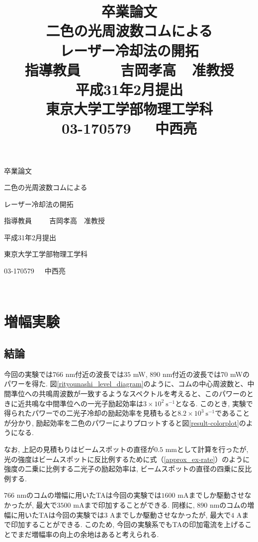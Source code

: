 \documentclass[uplatex, dvipdfmx, a4paper, report, papersize, 11pt]{jsbook}
\title{\fontsize{24.88pt}{0pt}\selectfont 卒業論文 \vspace{2cm}\\ 二色の光周波数コムによる\vspace{4mm}\\ レーザー冷却法の開拓 \vspace{3cm}\\ \fontsize{17.28pt}{0pt}\selectfont 指導教員\ \ \ \ \ 吉岡孝高\ \ 准教授 \vspace{4cm}\\ \fontsize{17.28pt}{0pt}\selectfont  平成31年2月提出 \vspace{2cm} \\ \fontsize{17.28pt}{0pt}\selectfont 東京大学工学部物理工学科 \vspace{3mm} \\ 03-170579\ \ \ 中西亮}
\date{}
\begin{document}
\begin{center}
  \Huge 卒業論文 \par
  \vspace{20mm}
  \Huge 二色の光周波数コムによる \par
  \vspace{4mm}
  \Huge レーザー冷却法の開拓 \par
  \vspace{30mm}
  \LARGE 指導教員\ \ \ \ \ 吉岡孝高\ \ 准教授\par
  \vspace{30mm}
  \LARGE 平成31年2月提出\par
  \vspace{15mm}
  \LARGE 東京大学工学部物理工学科 \par
  \vspace{10mm}
  \LARGE 03-170579\ \ \ 中西亮
  \vspace{10mm}
\end{center}
\thispagestyle{empty}
\clearpage
\addtocounter{page}{-2}
\newpage
\thispagestyle{empty}
　
\newpage

\setcounter{tocdepth}{2}
\tableofcontents

\newpage

\chapter{増幅実験}
\section{結論}

今回の実験では$766$ nm付近の波長では$35$ mW, $890$ nm付近の波長では$70$ mWのパワーを得た. 図\ref{rityounashi_level_diagram}のように、コムの中心周波数と、中間準位への共鳴周波数が一致するようなスペクトルを考えると、このパワーのときに近共鳴な中間準位への一光子励起効率は$3\times 10^2\ \mathrm{s^{-1}}$となる. このとき, 実験で得られたパワーでの二光子冷却の励起効率を見積もると$8.2\times10^3\ \mathrm{s^{-1}}$であることが分かり, 励起効率を二色のパワーによりプロットすると図\ref{result-colorplot}のようになる. \par
なお, 上記の見積もりはビームスポットの直径が$0.5$ mmとして計算を行ったが, 光の強度はビームスポットに反比例するために式（\ref{approx_ex-rate}）のように強度の二乗に比例する二光子の励起効率は, ビームスポットの直径の四乗に反比例する. \par
$766$ nmのコムの増幅に用いたTAは今回の実験では$1600$ mAまでしか駆動させなかったが, 最大で$3500$ mAまで印加することができる. 同様に, $890$ nmのコムの増幅に用いたTAは今回の実験では$3$ Aまでしか駆動させなかったが, 最大で$4$ Aまで印加することができる. このため, 今回の実験系でもTAの印加電流を上げることでまだ増幅率の向上の余地はあると考えられる. \par
\end{document}
